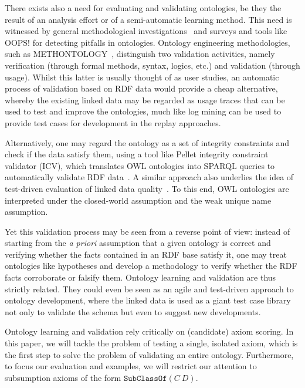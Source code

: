 \documentclass{sig-alternate}
\begin{document}
There exists also a need for evaluating and validating ontologies,
be they the result of an analysis effort or of a semi-automatic learning method.
This need is witnessed by general methodological investigations~\cite{GangemiCatenacciCiaramitaLehmann2005,GangemiCatenacciCiaramitaLehmann2006}
and surveys \cite{TartirBudakArpinarSheth2007} and tools like OOPS! \cite{PovedaSuarezGomez2012}
for detecting pitfalls in ontologies.
Ontology engineering methodologies, such as METHONTOLOGY~\cite{FernandezGomezJuristo1997},
distinguish two validation activities, namely verification (through formal methods, syntax, logics, etc.)
and validation (through usage). Whilst this latter is usually thought of as user studies,
an automatic process of validation based on RDF data would provide a cheap alternative,
whereby the existing linked data may be regarded as usage traces that can be used
to test and improve the ontologies, much like log mining can be used to provide
test cases for development in the replay approaches.

Alternatively, one may regard the ontology as a set of integrity constraints and check if the
data satisfy them, using a tool like Pellet integrity constraint validator (ICV),
which translates OWL ontologies into SPARQL queries to automatically validate RDF data~\cite{SirinTao2009}.
A similar approach also underlies the idea of test-driven evaluation of linked data 
quality~\cite{KontokostasWestphalAuerHellmannLehmannCornelissen2014}.
To this end, OWL ontologies are interpreted under the closed-world assumption and
the weak unique name assumption. 

Yet this validation process may be seen from a reverse point of view:
instead of starting from the \emph{a priori} assumption that a given ontology
is correct and verifying whether the facts contained in an RDF base satisfy it,
one may treat ontologies like hypotheses and develop a methodology to verify
whether the RDF facts corroborate or falsify them. Ontology learning and validation
are thus strictly related.
They could even be seen as an agile and test-driven approach to ontology development,
where the linked data is used as a giant test case library not only to validate the
schema but even to suggest new developments.

Ontology learning and validation rely critically on (candidate) axiom scoring.
In this paper, we will tackle the problem of testing a single, isolated axiom,
which is the first step to solve the problem of validating an entire ontology.
Furthermore, to focus our evaluation and examples, we will restrict our attention
to subsumption axioms of the form $\mathtt{SubClassOf}(C\ D)$.
\end{document}
